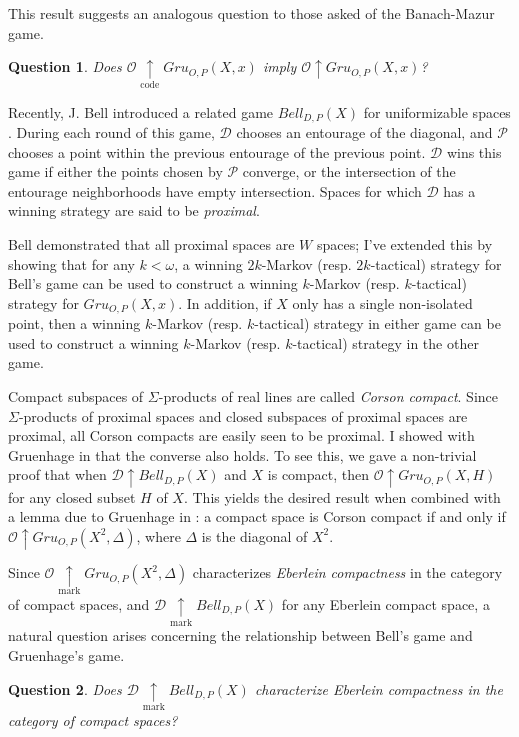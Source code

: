 \documentclass[11pt]{amsart}
\theoremstyle{plain}
\newtheorem{question}{Question}
\newcommand{\win}{\uparrow}
\newcommand{\markwin}{\underset{\text{mark}}{\uparrow}}
\newcommand{\codewin}{\underset{\text{code}}{\uparrow}}
\newcommand{\gruConGame}[2]{Gru_{O,P}(#1,#2)}
\newcommand{\bellConGame}[1]{Bell_{D,P}(#1)}
\newcommand{\<}{\langle}
\renewcommand{\>}{\rangle}
\newcommand{\pl}[1]{\mathscr{#1}}
\newcommand{\term}{\textit}
\begin{document}
This result suggests an analogous question to those asked of the
Banach-Mazur game.

\begin{question}
  Does $\pl O\codewin\gruConGame{X}{x}$ imply $\pl O\win\gruConGame{X}{x}$?
\end{question}

Recently, J. Bell introduced a related game $\bellConGame{X}$ for uniformizable
spaces \cite{MR3239205}. During each round of this game, $\pl D$ chooses an
entourage of the diagonal, and $\pl P$ chooses a point within the previous
entourage of the previous point.
$\pl D$ wins this game if either the points chosen by $\pl P$ converge,
or the intersection of the entourage neighborhoods have empty intersection.
Spaces for which $\pl D$ has a winning strategy
are said to be \term{proximal}.

Bell demonstrated that all proximal spaces
are $W$ spaces; I've extended this by showing that for any $k<\omega$,
a winning $2k$-Markov (resp. $2k$-tactical) strategy for Bell's game can be
used to construct a winning $k$-Markov (resp. $k$-tactical) strategy for
$\gruConGame{X}{x}$. In addition, if $X$ only has a single non-isolated point,
then a winning $k$-Markov (resp. $k$-tactical) strategy in either game can be
used to construct a winning $k$-Markov (resp. $k$-tactical) strategy in the
other game.

Compact subspaces of $\Sigma$-products of real lines are called
\term{Corson compact}. Since $\Sigma$-products of proximal spaces and
closed subspaces of proximal spaces are proximal, all Corson compacts are
easily seen to be proximal. I showed with Gruenhage in \cite{MR3227201} that
the converse also holds. To see this, we gave a non-trivial proof that when
$\pl D\win\bellConGame{X}$ and $X$ is compact, then
$\pl O\win\gruConGame{X}{H}$ for any closed subset
$H$ of $X$. This yields the desired result when combined with a lemma due to
Gruenhage in \cite{MR752278}: a
compact space is Corson compact if and only if
$\pl O\win\gruConGame{X^2}{\Delta}$, where $\Delta$ is the diagonal of $X^2$.

Since $\pl O\markwin\gruConGame{X^2}{\Delta}$ characterizes \term{Eberlein
compactness} in the category of compact spaces, and
$\pl D\markwin\bellConGame{X}$ for any Eberlein compact space,
a natural question arises
concerning the relationship between Bell's game and Gruenhage's game.

\begin{question}
  Does $\pl D\markwin\bellConGame{X}$
  characterize Eberlein compactness in the category of compact spaces?
\end{question}
\end{document}
